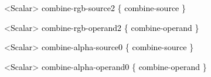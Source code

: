 \documentclass[a4paper]{article}
\newcommand\textstyleOOoComputerKeyWord[1]{\textrm{\textcolor[rgb]{0.0,0.0,0.5019608}{#1}}}
\newcommand\textstyleOOoAssemblerSpecialChar[1]{\textrm{\textcolor[rgb]{0.0,0.5019608,0.0}{#1}}}
\newcommand\textstyleOOoAssemblerIdent[1]{\textrm{\textcolor{black}{#1}}}
\begin{document}
{\color{black}
\textstyleOOoComputerKeyWord{\textcolor{black}{\ \ }}\textstyleOOoAssemblerSpecialChar{{\textless}}\textstyleOOoAssemblerIdent{Scalar}\textstyleOOoAssemblerSpecialChar{{\textgreater}}\textstyleOOoComputerKeyWord{\textcolor{black}{
}}\textstyleOOoAssemblerIdent{combine}\textstyleOOoAssemblerSpecialChar{{}-}\textstyleOOoAssemblerIdent{rgb}\textstyleOOoAssemblerSpecialChar{{}-}\textstyleOOoAssemblerIdent{source2}\textstyleOOoComputerKeyWord{\textcolor{black}{
}}\textstyleOOoAssemblerSpecialChar{\{}\textstyleOOoComputerKeyWord{\textcolor{black}{
}}\textstyleOOoAssemblerIdent{combine}\textstyleOOoAssemblerSpecialChar{{}-}\textstyleOOoAssemblerIdent{source}\textstyleOOoComputerKeyWord{\textcolor{black}{
}}\textstyleOOoAssemblerSpecialChar{\}}}

{\color{black}
\textstyleOOoComputerKeyWord{\textcolor{black}{\ \ }}\textstyleOOoAssemblerSpecialChar{{\textless}}\textstyleOOoAssemblerIdent{Scalar}\textstyleOOoAssemblerSpecialChar{{\textgreater}}\textstyleOOoComputerKeyWord{\textcolor{black}{
}}\textstyleOOoAssemblerIdent{combine}\textstyleOOoAssemblerSpecialChar{{}-}\textstyleOOoAssemblerIdent{rgb}\textstyleOOoAssemblerSpecialChar{{}-}\textstyleOOoAssemblerIdent{operand2}\textstyleOOoComputerKeyWord{\textcolor{black}{
}}\textstyleOOoAssemblerSpecialChar{\{}\textstyleOOoComputerKeyWord{\textcolor{black}{
}}\textstyleOOoAssemblerIdent{combine}\textstyleOOoAssemblerSpecialChar{{}-}\textstyleOOoAssemblerIdent{operand}\textstyleOOoComputerKeyWord{\textcolor{black}{
}}\textstyleOOoAssemblerSpecialChar{\}}}

{\color{black}
\textstyleOOoComputerKeyWord{\textcolor{black}{\ \ }}\textstyleOOoAssemblerSpecialChar{{\textless}}\textstyleOOoAssemblerIdent{Scalar}\textstyleOOoAssemblerSpecialChar{{\textgreater}}\textstyleOOoComputerKeyWord{\textcolor{black}{
}}\textstyleOOoAssemblerIdent{combine}\textstyleOOoAssemblerSpecialChar{{}-}\textstyleOOoAssemblerIdent{alpha}\textstyleOOoAssemblerSpecialChar{{}-}\textstyleOOoAssemblerIdent{source0}\textstyleOOoComputerKeyWord{\textcolor{black}{
}}\textstyleOOoAssemblerSpecialChar{\{}\textstyleOOoComputerKeyWord{\textcolor{black}{
}}\textstyleOOoAssemblerIdent{combine}\textstyleOOoAssemblerSpecialChar{{}-}\textstyleOOoAssemblerIdent{source}\textstyleOOoComputerKeyWord{\textcolor{black}{
}}\textstyleOOoAssemblerSpecialChar{\}}}

{\color{black}
\textstyleOOoComputerKeyWord{\textcolor{black}{\ \ }}\textstyleOOoAssemblerSpecialChar{{\textless}}\textstyleOOoAssemblerIdent{Scalar}\textstyleOOoAssemblerSpecialChar{{\textgreater}}\textstyleOOoComputerKeyWord{\textcolor{black}{
}}\textstyleOOoAssemblerIdent{combine}\textstyleOOoAssemblerSpecialChar{{}-}\textstyleOOoAssemblerIdent{alpha}\textstyleOOoAssemblerSpecialChar{{}-}\textstyleOOoAssemblerIdent{operand0}\textstyleOOoComputerKeyWord{\textcolor{black}{
}}\textstyleOOoAssemblerSpecialChar{\{}\textstyleOOoComputerKeyWord{\textcolor{black}{
}}\textstyleOOoAssemblerIdent{combine}\textstyleOOoAssemblerSpecialChar{{}-}\textstyleOOoAssemblerIdent{operand}\textstyleOOoComputerKeyWord{\textcolor{black}{
}}\textstyleOOoAssemblerSpecialChar{\}}}
\end{document}
